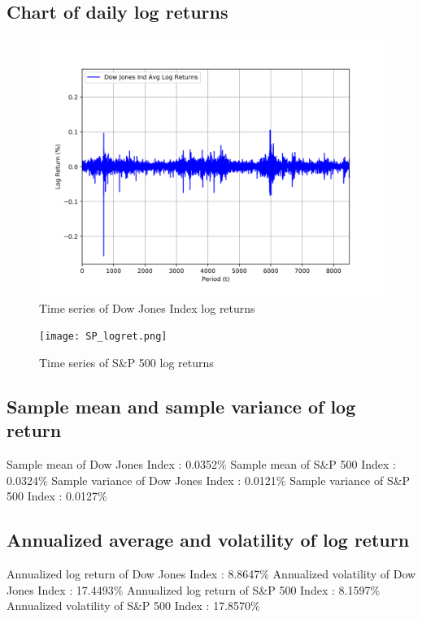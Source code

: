 \documentclass[a4paper]{article}
\begin{document}
\newpage
\subsection{Chart of daily log returns}

\begin{figure}[h!]
	\centering
	\includegraphics[width=0.8\linewidth]{DJI_logret.png}
	\caption{Time series of Dow Jones Index log returns}
\end{figure}
\begin{figure}[h!]
	\centering
	\texttt{[image: SP\_logret.png]}
	\caption{Time series of S\&P 500 log returns}
\end{figure}

\subsection{Sample mean and sample variance of log return}
\begin{flushleft}
Sample mean of Dow Jones Index : 0.0352\%  \linebreak 
Sample mean of S\&P 500 Index : 0.0324\%  \linebreak 
Sample variance of Dow Jones Index : 0.0121\%  \linebreak 
Sample variance of S\&P 500 Index : 0.0127\%  \linebreak 
\end{flushleft}

\subsection{Annualized average and volatility of log return}
\begin{flushleft}
Annualized log return of Dow Jones Index : 8.8647\% \linebreak 
Annualized volatility of Dow Jones Index : 17.4493\% \linebreak 
Annualized log return of S\&P 500 Index : 8.1597\% \linebreak 
Annualized volatility of S\&P 500 Index : 17.8570\% \linebreak 
\end{flushleft}
\end{document}

